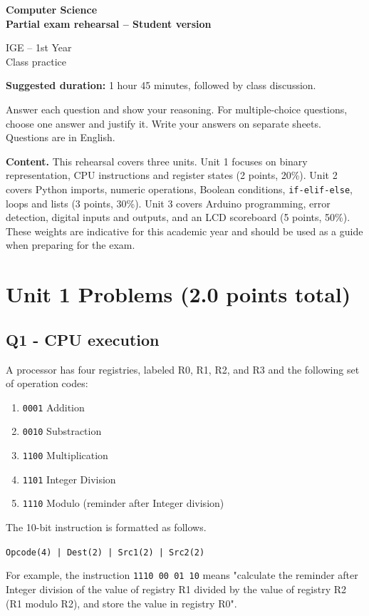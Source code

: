 \documentclass[10pt]{article}
\let\OldSection\section
\renewcommand{\section}{\clearpage\OldSection}
\begin{document}
\begin{center}
{\LARGE\bfseries Computer Science\\Partial exam rehearsal -- Student version\par}
\vspace{1em}
IGE -- 1st Year\\Class practice
\end{center}
\textbf{Suggested duration:} 1 hour 45 minutes, followed by class discussion.

Answer each question and show your reasoning. For multiple-choice questions, choose one answer and justify it. Write your answers on separate sheets. Questions are in English.

\textbf{Content.} This rehearsal covers three units. Unit 1 focuses on binary representation, CPU instructions and register states (2 points, 20\%). Unit 2 covers Python imports, numeric operations, Boolean conditions, \texttt{if-elif-else}, loops and lists (3 points, 30\%). Unit 3 covers Arduino programming, error detection, digital inputs and outputs, and an LCD scoreboard (5 points, 50\%). These weights are indicative for this academic year and should be used as a guide when preparing for the exam.

\section*{Unit 1 Problems (2.0 points total)}

\subsection*{Q1 - CPU execution}
A processor has four registries, labeled R0, R1, R2, and R3 and the following set of operation codes: 
\begin{enumerate}
    \item \texttt{0001} Addition
    \item \texttt{0010} Substraction
    \item \texttt{1100} Multiplication
    \item \texttt{1101} Integer Division
    \item \texttt{1110} Modulo (reminder after Integer division)
\end{enumerate}
The 10-bit instruction is formatted as follows. 

\texttt{Opcode(4) | Dest(2) | Src1(2) | Src2(2)}

For example, the instruction \texttt{1110 00 01 10} means "calculate the reminder after Integer division of the value of registry R1 divided by the value of registry R2 (R1 modulo R2), and store the value in registry R0".
\end{document}
